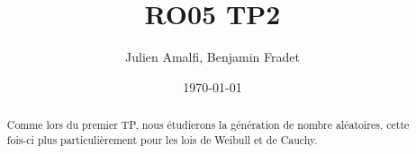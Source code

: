 \documentclass{article}
\title{RO05 TP2}
\author{Julien Amalfi, Benjamin Fradet}
\date{\today}
\begin{document}
\maketitle
\thispagestyle{fancy}


\begin{abstract}

    Comme lors du premier TP, nous étudierons la génération de nombre
    aléatoires, cette fois-ci plus particulièrement pour les lois de Weibull et
    de Cauchy.

\end{abstract}

\end{document}
